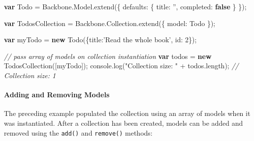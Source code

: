 \documentclass[9pt]{book}
\newenvironment{Shaded}{}{}
\newcommand{\KeywordTok}[1]{\textcolor[rgb]{0.00,0.44,0.13}{\textbf{{#1}}}}
\newcommand{\DataTypeTok}[1]{\textcolor[rgb]{0.56,0.13,0.00}{{#1}}}
\newcommand{\DecValTok}[1]{\textcolor[rgb]{0.25,0.63,0.44}{{#1}}}
\newcommand{\StringTok}[1]{\textcolor[rgb]{0.25,0.44,0.63}{{#1}}}
\newcommand{\CommentTok}[1]{\textcolor[rgb]{0.38,0.63,0.69}{\textit{{#1}}}}
\newcommand{\OtherTok}[1]{\textcolor[rgb]{0.00,0.44,0.13}{{#1}}}
\newcommand{\FunctionTok}[1]{\textcolor[rgb]{0.02,0.16,0.49}{{#1}}}
\newcommand{\NormalTok}[1]{{#1}}
\begin{document}
\begin{Shaded}
\begin{Highlighting}[]
\KeywordTok{var} \NormalTok{Todo = }\OtherTok{Backbone}\NormalTok{.}\OtherTok{Model}\NormalTok{.}\FunctionTok{extend}\NormalTok{(\{}
  \DataTypeTok{defaults}\NormalTok{: \{}
    \DataTypeTok{title}\NormalTok{: }\StringTok{''}\NormalTok{,}
    \DataTypeTok{completed}\NormalTok{: }\KeywordTok{false}
  \NormalTok{\}}
\NormalTok{\});}

\KeywordTok{var} \NormalTok{TodosCollection = }\OtherTok{Backbone}\NormalTok{.}\OtherTok{Collection}\NormalTok{.}\FunctionTok{extend}\NormalTok{(\{}
  \DataTypeTok{model}\NormalTok{: Todo}
\NormalTok{\});}

\KeywordTok{var} \NormalTok{myTodo = }\KeywordTok{new} \FunctionTok{Todo}\NormalTok{(\{}\DataTypeTok{title}\NormalTok{:}\StringTok{'Read the whole book'}\NormalTok{, }\DataTypeTok{id}\NormalTok{: }\DecValTok{2}\NormalTok{\});}

\CommentTok{// pass array of models on collection instantiation}
\KeywordTok{var} \NormalTok{todos = }\KeywordTok{new} \FunctionTok{TodosCollection}\NormalTok{([myTodo]);}
\OtherTok{console}\NormalTok{.}\FunctionTok{log}\NormalTok{(}\StringTok{"Collection size: "} \NormalTok{+ }\OtherTok{todos}\NormalTok{.}\FunctionTok{length}\NormalTok{); }\CommentTok{// Collection size: 1}
\end{Highlighting}
\end{Shaded}

\paragraph{Adding and Removing Models}\label{adding-and-removing-models}

The preceding example populated the collection using an array of models
when it was instantiated. After a collection has been created, models
can be added and removed using the \texttt{add()} and \texttt{remove()}
methods:
\end{document}
